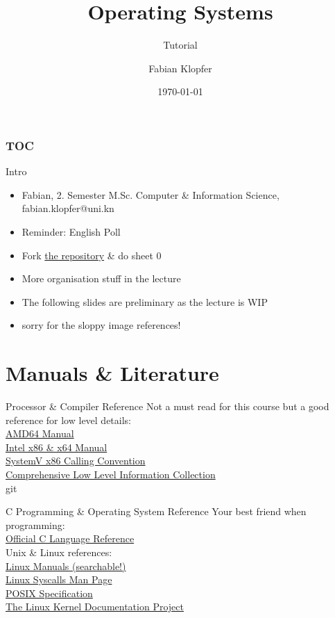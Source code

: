 \documentclass[10pt]{beamer}
\title{\textbf{Operating Systems}}
\subtitle{Tutorial}
\author{Fabian Klopfer}
\date{\today}
\begin{document}
\frame{\titlepage}

\begin{frame}
  \frametitle{TOC}
  \tableofcontents[hideallsubsections]
\end{frame}

\begin{frame}{Intro}
\begin{itemize}
 \item Fabian, 2. Semester M.Sc. Computer \& Information Science, fabian.klopfer@uni.kn 
 \item Reminder: English Poll
 \item Fork \href{https://gitlab.inf.uni-konstanz.de/matthias.rupp/betriebssysteme/}{the repository} \& do sheet 0
 \item More organisation stuff in the lecture
 \item The following slides are preliminary as the lecture is WIP
 \item sorry for the sloppy image references!
\end{itemize}
\end{frame}

\section{Manuals \& Literature}
    \begin{frame}{Processor \& Compiler Reference}
    Not a must read for this course but a good reference for low level details: \\
        \href{https://www.amd.com/system/files/TechDocs/24593.pdf}{AMD64 Manual} \\
        \href{https://software.intel.com/content/dam/develop/public/us/en/documents/325462-sdm-vol-1-2abcd-3abcd.pdf}{Intel x86 \& x64 Manual} \\
        \href{https://uclibc.org/docs/psABI-x86\_64.pdf}{SystemV x86 Calling Convention} \\
        \href{https://www.sandpile.org/}{Comprehensive Low Level Information Collection} \\git 
    \end{frame}

    \begin{frame}{C Programming \& Operating System Reference}
        Your best friend when programming: \\
        \href{https://en.cppreference.com/w/c}{Official C Language Reference} \vspace{2cm} \\ 
        Unix \& Linux references: \\
        \href{https://linux.die.net/}{Linux Manuals (searchable!)} \\
        \href{https://linux.die.net/man/2/syscalls}{Linux Syscalls Man Page} \\
        \href{https://pubs.opengroup.org/onlinepubs/9699919799/functions/contents.html}{POSIX Specification} \\
        \href{https://tldp.org/}{The Linux Kernel Documentation Project} \\
    \end{frame}
    
\end{document}
